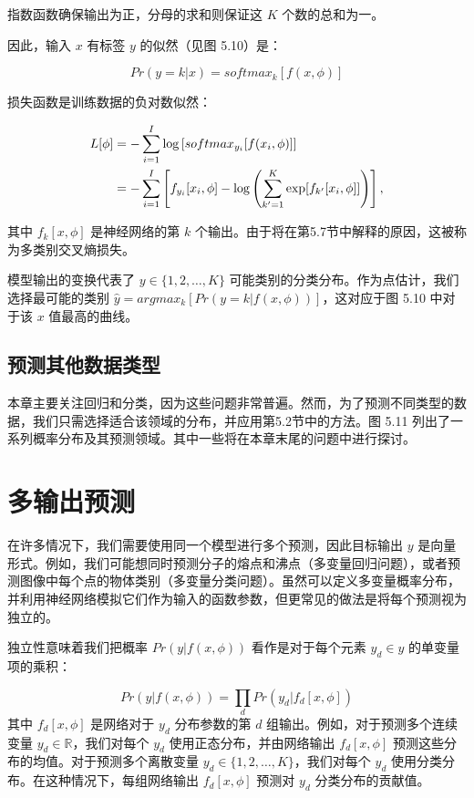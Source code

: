 \documentclass[lang=cn,newtx,10pt,scheme=chinese]{elegantbook}
\begin{document}
指数函数确保输出为正，分母的求和则保证这 \(K\) 个数的总和为一。

因此，输入 \(x\) 有标签 \(y\) 的似然（见图 5.10）是：

\begin{equation}
Pr(y = k|x) = softmax_k[f(x, \phi)] 
\end{equation}

损失函数是训练数据的负对数似然：

\begin{align}
L[\phi] &= -\sum_{i=1}^{I} \log \left[ softmax_{y_i} [f(x_i, \phi)] \right] \notag \\
&= -\sum_{i=1}^{I} \left[ f_{y_i}[x_i, \phi] - \log \left( \sum_{k'=1}^{K} \exp [f_{k'}[x_i, \phi]] \right) \right],
\end{align}

其中 \(f_k[x, \phi]\) 是神经网络的第 \(k\) 个输出。由于将在第5.7节中解释的原因，这被称为多类别交叉熵损失。

模型输出的变换代表了 \(y \in \{1, 2, \ldots, K\}\) 可能类别的分类分布。作为点估计，我们选择最可能的类别 \(\hat{y} = argmax_k[Pr(y = k|f(x, \phi))]\)，这对应于图 5.10 中对于该 \(x\) 值最高的曲线。

\subsection{预测其他数据类型}

本章主要关注回归和分类，因为这些问题非常普遍。然而，为了预测不同类型的数据，我们只需选择适合该领域的分布，并应用第5.2节中的方法。图 5.11 列出了一系列概率分布及其预测领域。其中一些将在本章末尾的问题中进行探讨。

\section{多输出预测}

在许多情况下，我们需要使用同一个模型进行多个预测，因此目标输出 \(y\) 是向量形式。例如，我们可能想同时预测分子的熔点和沸点（多变量回归问题），或者预测图像中每个点的物体类别（多变量分类问题）。虽然可以定义多变量概率分布，并利用神经网络模拟它们作为输入的函数参数，但更常见的做法是将每个预测视为独立的。

独立性意味着我们把概率 \(Pr(y|f(x, \phi))\) 看作是对于每个元素 \(y_d \in y\) 的单变量项的乘积：

\begin{equation}
Pr(y|f(x, \phi)) = \prod_{d} Pr(y_d|f_d[x, \phi]) 
\end{equation}
其中 \(f_d[x, \phi]\) 是网络对于 \(y_d\) 分布参数的第 \(d\) 组输出。例如，对于预测多个连续变量 \(y_d \in \mathbb{R}\)，我们对每个 \(y_d\) 使用正态分布，并由网络输出 \(f_d[x, \phi]\) 预测这些分布的均值。对于预测多个离散变量 \(y_d \in \{1, 2, \ldots, K\}\)，我们对每个 \(y_d\) 使用分类分布。在这种情况下，每组网络输出 \(f_d[x, \phi]\) 预测对 \(y_d\) 分类分布的贡献值。
\end{document}
